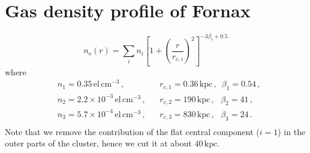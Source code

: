 \documentclass[10pt,aps,pra,reprint,amsmath,amsfonts,amssymb,showpacs,nofootinbib,floatfix]{revtex4-1}
\newcommand{\rmn}{\mathrm}
\newcommand{\kpc}{\rmn{kpc}}
\newcommand{\e}{\rmn{e}}
\begin{document}
%  
%



\section{Gas density profile of Fornax}

\begin{equation}
n_\e(r) = \sum_i n_i\left[1+\left(\frac{r}{r_{c,i}}\right)^2\right]^{-3\beta_i+0.5}
\end{equation}
where
\begin{align}
&n_1 = 0.35\, \rmn{el}\,\rmn{cm}^{-3}\,,
&&r_{c,1} = 0.36\,\kpc\,,\,\,\,
\beta_1 = 0.54\,, \nonumber\\
&n_2 = 2.2\times10^{-3}\,\rmn{el}\,\rmn{cm}^{-3}\,,
&&r_{c,2} = 190\,\kpc\,,\,\,\,\,
\beta_2 = 41\,, \nonumber\\
&n_3 = 5.7\times10^{-4}\,\rmn{el}\,\rmn{cm}^{-3}\,,
&&r_{c,3} = 830\,\kpc\,,\,\,\,\,
\beta_3 = 24\,. \nonumber\\
& &&
\label{fit_fornax}
\end{align}
Note that we remove the contribution of the flat central component
($i=1$) in the outer parts of the cluster, hence we cut it at about
$40\,\kpc$.
\end{document}
